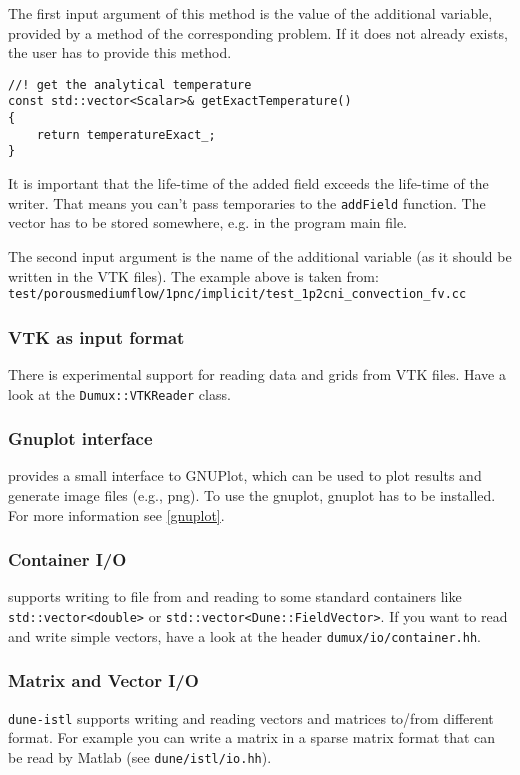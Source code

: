 The first input argument of this method is the value of the additional variable, provided by a method of the corresponding problem.
If it does not already exists, the user has to provide this method.
\begin{lstlisting}[style=DumuxCode]
//! get the analytical temperature
const std::vector<Scalar>& getExactTemperature()
{
    return temperatureExact_;
}
\end{lstlisting}
It is important that the life-time of the added field exceeds the life-time of the writer. That means you can't pass temporaries
to the \texttt{addField} function. The vector has to be stored somewhere, e.g. in the program main file.

The second input argument is the name of the additional variable (as it should be written in the VTK files).
The example above is taken from: \\ \texttt{test/porousmediumflow/1pnc/implicit/test\_1p2cni\_convection\_fv.cc}

\subsubsection{VTK as input format}
There is experimental support for reading data and grids from VTK files. Have a look at the \texttt{Dumux::VTKReader} class.

\subsubsection{Gnuplot interface}
\Dumux provides a small interface to GNUPlot, which can be used to plot results and generate
image files (e.g., png). To use the gnuplot, gnuplot has to be installed. For more information see \ref{gnuplot}.

\subsubsection{Container I/O}
\Dumux supports writing to file from and reading to some standard \Cplusplus containers like \texttt{std::vector<double>} or \texttt{std::vector<Dune::FieldVector>}.
If you want to read and write simple vectors, have a look at the header \texttt{dumux/io/container.hh}.

\subsubsection{Matrix and Vector I/O}
\texttt{dune-istl} supports writing and reading vectors and matrices to/from different format. For example you can write a matrix in a sparse matrix format that
can be read by Matlab (see \texttt{dune/istl/io.hh}).
